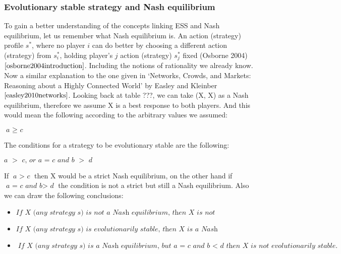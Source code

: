 \documentclass{article}
\begin{document}
\subsubsection{Evolutionary stable strategy and Nash equilibrium}
To gain a better understanding of the concepts linking ESS and Nash equilibrium, let us remember what Nash equilibrium is. 
An action (strategy) profile $s^*$, where no player $\textit{i}$ can do better by choosing a different action (strategy) from $s^*_i$, holding player’s $\textit{j}$ action (strategy) $s^*_{j}$ fixed (Osborne 2004)$\cite{osborne2004introduction}$.  Including the notions of rationality we already know.   
Now a similar explanation to the one given in ‘Networks, Crowds, and Markets: Reasoning about a Highly Connected World’ by Easley and Kleinber$\cite{easley2010networks}$.
Looking back at table ???, we can take (X, X) as a Nash equilibrium, therefore we assume X is a best response to both players. And this would mean the following according to the arbitrary values we assumed:
\begin{center}
$\textit{a $\geq$ c}$
\end{center}
The conditions for a strategy to be evolutionary stable are the following:
\begin{center}
$\textit{a $>$ c, or a = c and b $>$ d}$
\end{center}
If $\textit{a $>$ c}$ then X would be a strict Nash equilibrium, on the other hand if $\textit{a = c and b$>$ d}$ the condition is not a strict but still a Nash equilibrium. Also we can draw the following conclusions:

\begin{itemize}
\item $\textit{If X (any strategy s) is not a Nash equilibrium, then X is not evolutionarily stable.}$ 
\item $\textit{If X (any strategy s) is evolutionarily stable, then X is a Nash equilibrium.}$ 
\item $\textit{If X (any strategy s) is a Nash equilibrium, but  $\textit{a = c and b $<$ d}$ then X is not evolutionarily stable.}$
\end{itemize}
\end{document}
